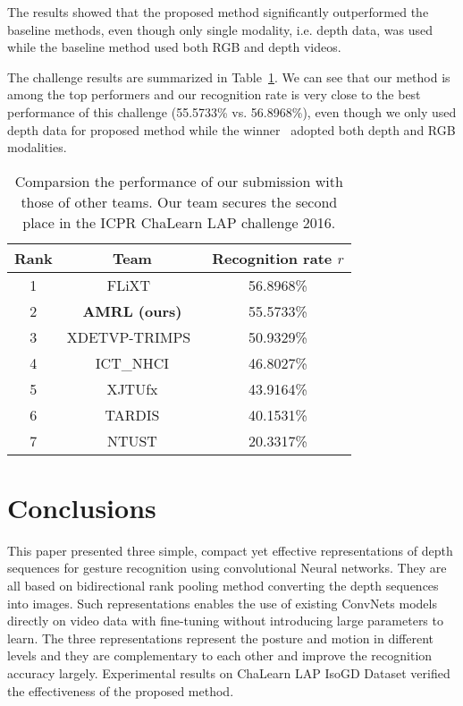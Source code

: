 \documentclass[10pt, a4paper, conference]{IEEEtran}
\begin{document}
The results showed that the proposed method 
significantly outperformed the baseline methods, even though only single 
modality, i.e. depth data, was used while the baseline method used both RGB and 
depth videos.

The challenge results are summarized in Table~\ref{table3}. We can see that our method is among the top performers and our recognition rate is very close to the best performance of this challenge (55.5733\% vs. 56.8968\%), even though we only used depth data for proposed method while the winner~\cite{yunanli} adopted both depth and RGB modalities.

\begin{table}[!ht]
\centering
\caption{Comparsion the performance of our submission with those of other teams. Our team secures the second place in the ICPR ChaLearn LAP challenge 2016. \label{table3}}
\begin{tabular}{|c|c|c|}
\hline
Rank & Team & Recognition rate $r$\\
\hline
1 & FLiXT~\cite{yunanli} & 56.8968\%\\
\hline
2 & \textbf{AMRL (ours)} & 55.5733\%\\
\hline
3 & XDETVP-TRIMPS~\cite{guangming} & 50.9329\%\\
\hline
4 & ICT\_NHCI & 46.8027\%\\
\hline
5 & XJTUfx & 43.9164\%\\
\hline
6 & TARDIS & 40.1531\%\\
\hline
7 & NTUST & 20.3317\%\\
\hline
\end{tabular}
\end{table}

\section{Conclusions}

This paper presented three simple, compact yet effective representations of depth sequences for gesture recognition using convolutional Neural networks. They are all based on bidirectional rank pooling method converting the depth sequences into images. Such representations enables the use of existing ConvNets models directly on video data with fine-tuning without introducing large parameters to learn. The three representations represent the posture and motion in different levels and they are complementary to each other and improve the recognition accuracy largely. Experimental results on ChaLearn LAP IsoGD Dataset verified the effectiveness of the proposed method.
\end{document}
